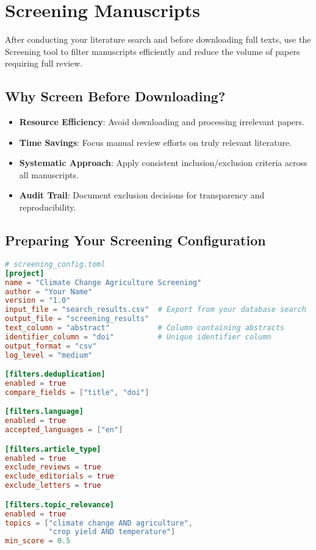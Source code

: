 \section{Screening Manuscripts}

After conducting your literature search and before downloading full texts, use the Screening tool to filter manuscripts efficiently and reduce the volume of papers requiring full review.

\subsection{Why Screen Before Downloading?}

\begin{itemize}
    \item \textbf{Resource Efficiency}: Avoid downloading and processing irrelevant papers.
    \item \textbf{Time Savings}: Focus manual review efforts on truly relevant literature.
    \item \textbf{Systematic Approach}: Apply consistent inclusion/exclusion criteria across all manuscripts.
    \item \textbf{Audit Trail}: Document exclusion decisions for transparency and reproducibility.
\end{itemize}

\subsection{Preparing Your Screening Configuration}

\begin{configbox}
\begin{lstlisting}[language=TOML]
# screening_config.toml
[project]
name = "Climate Change Agriculture Screening"
author = "Your Name"
version = "1.0"
input_file = "search_results.csv"  # Export from your database search
output_file = "screening_results"
text_column = "abstract"           # Column containing abstracts
identifier_column = "doi"          # Unique identifier column
output_format = "csv"
log_level = "medium"

[filters.deduplication]
enabled = true
compare_fields = ["title", "doi"]

[filters.language]
enabled = true
accepted_languages = ["en"]

[filters.article_type]
enabled = true
exclude_reviews = true
exclude_editorials = true
exclude_letters = true

[filters.topic_relevance]
enabled = true
topics = ["climate change AND agriculture",
          "crop yield AND temperature"]
min_score = 0.5
\end{lstlisting}
\end{configbox}

